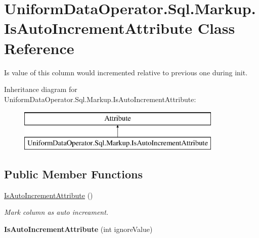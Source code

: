 \hypertarget{class_uniform_data_operator_1_1_sql_1_1_markup_1_1_is_auto_increment_attribute}{}\section{Uniform\+Data\+Operator.\+Sql.\+Markup.\+Is\+Auto\+Increment\+Attribute Class Reference}
\label{class_uniform_data_operator_1_1_sql_1_1_markup_1_1_is_auto_increment_attribute}


Is value of this column would incremented relative to previous one during init.  


Inheritance diagram for Uniform\+Data\+Operator.\+Sql.\+Markup.\+Is\+Auto\+Increment\+Attribute\+:\begin{figure}[H]
\begin{center}
\leavevmode
\includegraphics[height=2.000000cm]{d8/dbb/class_uniform_data_operator_1_1_sql_1_1_markup_1_1_is_auto_increment_attribute}
\end{center}
\end{figure}
\subsection*{Public Member Functions}
\begin{DoxyCompactItemize}
\item 
\mbox{\hyperlink{class_uniform_data_operator_1_1_sql_1_1_markup_1_1_is_auto_increment_attribute_a08b552e4e7152960faef3ecbd14eaf37}{Is\+Auto\+Increment\+Attribute}} ()
\begin{DoxyCompactList}\small\item\em Mark column as auto increament. \end{DoxyCompactList}\item 
\mbox{\label{class_uniform_data_operator_1_1_sql_1_1_markup_1_1_is_auto_increment_attribute_a9818a7b2015d08c7e682988f382a0755}} 
{\bfseries Is\+Auto\+Increment\+Attribute} (int ignore\+Value)
\end{DoxyCompactItemize}
